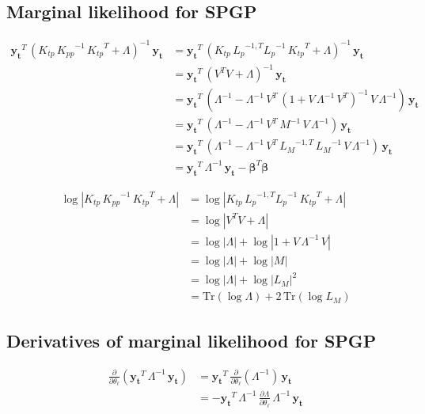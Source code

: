 \documentclass[11pt,a4paper]{article}
\newcommand{\abs}[1]{\left| #1 \right|}
\newcommand{\tr}{\text{Tr}}
\numberwithin{equation}{section}
\begin{document}
\subsection{Marginal likelihood for SPGP \label{APP:detail_mlik_spgp}}

\begin{align}
\mathbf{y_t}^T\,(K_{tp}\,{K_{pp}}^{-1}\,{K_{tp}}^T + \Lambda)^{-1}\,\mathbf{y_t}
 &= \mathbf{y_t}^T\,(K_{tp}\,{L_p}^{-1,T}{L_p}^{-1}\,{K_{tp}}^T + \Lambda)^{-1}\,\mathbf{y_t} \\
 &= \mathbf{y_t}^T\,(V^T V + \Lambda)^{-1}\,\mathbf{y_t} \\
 &= \mathbf{y_t}^T\,(\Lambda^{-1} - \Lambda^{-1}\,V^T\,(1 + V\,\Lambda^{-1}\,V^T)^{-1}\,V\,\Lambda^{-1})\,\mathbf{y_t} \\
 &= \mathbf{y_t}^T\,(\Lambda^{-1} - \Lambda^{-1}\,V^T\,M^{-1}\,V\,\Lambda^{-1})\,\mathbf{y_t} \\
 &= \mathbf{y_t}^T\,(\Lambda^{-1} - \Lambda^{-1}\,V^T\,{L_M}^{-1,T}\,{L_M}^{-1}\,V\,\Lambda^{-1})\,\mathbf{y_t} \\
 &= \mathbf{y_t}^T\,\Lambda^{-1}\,\mathbf{y_t} - {\bm \beta}^T{\bm \beta}
\end{align}

\begin{align}
\log \abs{K_{tp}\,{K_{pp}}^{-1}\,{K_{tp}}^T + \Lambda}
 &= \log \abs{K_{tp}\,{L_p}^{-1,T}{L_p}^{-1}\,{K_{tp}}^T + \Lambda} \\
 &= \log \abs{V^T V + \Lambda} \\
 &= \log \abs{\Lambda} + \log \abs{1 + V\,\Lambda^{-1}\,V} \\
 &= \log \abs{\Lambda} + \log \abs{M} \\
 &= \log \abs{\Lambda} + \log \abs{L_M}^2 \\
 &= \tr \left(\log \Lambda \right) + 2\,\tr \left(\log L_M \right)
\end{align}

\subsection{Derivatives of marginal likelihood for SPGP \label{APP:detail_mlik_der_spgp}}

\begin{align}
\frac{\partial}{\partial \theta_\ell}\left(\mathbf{y_t}^T\,\Lambda^{-1}\,\mathbf{y_t}\right)
  &= \mathbf{y_t}^T\,\frac{\partial}{\partial \theta_\ell}\left(\Lambda^{-1}\right)\,\mathbf{y_t} \\
  &= -\mathbf{y_t}^T\,\Lambda^{-1}\,\frac{\partial \Lambda}{\partial \theta_\ell}\,\Lambda^{-1}\,\mathbf{y_t}
\end{align}
\end{document}
